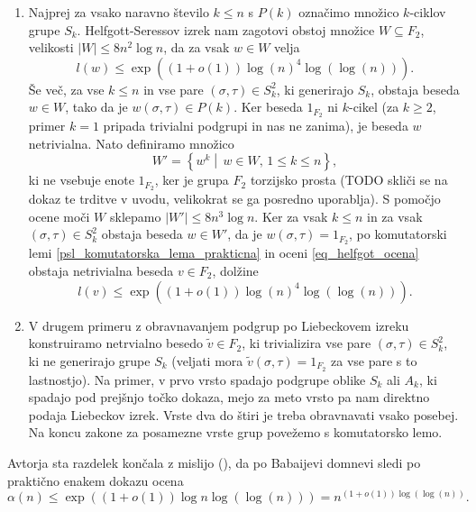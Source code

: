 \begin{enumerate}
    \item Najprej za vsako naravno število $k \le n$ s $P(k)$ označimo množico $k$-ciklov grupe $S_k$. Helfgott-Seressov izrek nam zagotovi obstoj množice $W \subseteq F_2$, velikosti $\lvert W \rvert \le 8n^2 \log n$, da za vsak $w \in W$ velja \begin{equation}\label{eq_helfgot_ocena}
        l(w) \le \exp((1 + o(1)) \log(n)^{4} \log(\log(n))).
    \end{equation}  
    Še več, za vse $k \le n$ in vse pare $(\sigma, \tau) \in S_k^2$, ki generirajo $S_k$,
    obstaja beseda $w \in W$, tako da je $w(\sigma, \tau) \in P(k)$. Ker beseda $1_{F_2}$ ni $k$-cikel (za $k \ge 2$, primer $k = 1$ pripada trivialni podgrupi in nas ne zanima), je beseda $w$ netrivialna. Nato definiramo množico \begin{equation*}
    W' = \left\{ w^{k}  \middle|\,  w \in W , \, 1 \le  k \le  n \right\}, 
    \end{equation*}  
    ki ne vsebuje enote $1_{F_2}$, ker je grupa $F_2$ torzijsko prosta (TODO skliči se na dokaz te trditve v uvodu, velikokrat se ga posredno uporablja). S pomočjo ocene moči $W$ sklepamo $\lvert W' \rvert \le 8 n^3 \log n$.
    Ker za vsak $k \le n$ in za vsak $(\sigma, \tau) \in S_k^2$ obstaja beseda $w \in W'$, da je $w(\sigma, \tau) = 1_{F_2}$, po komutatorski lemi \ref{psl_komutatorska_lema_prakticna} in oceni \ref{eq_helfgot_ocena} obstaja netrivialna beseda $v \in F_2$, dolžine
    \begin{equation*}
    l(v) \le \exp((1 + o(1)) \log(n)^{4} \log(\log(n))).
    \end{equation*}  
    \item V drugem primeru z obravnavanjem podgrup po Liebeckovem izreku konstruiramo netrvialno besedo $\tilde{v} \in F_2$, ki trivializira vse pare $(\sigma, \tau) \in S_k^2$, ki ne generirajo
    grupe $S_k$ (veljati mora $\tilde{v}(\sigma, \tau) = 1_{F_2}$ za vse pare s to lastnostjo). Na primer, v prvo vrsto spadajo podgrupe oblike $S_k$ ali $A_k$, ki spadajo pod prejšnjo točko dokaza, mejo za meto vrsto pa nam direktno podaja Liebeckov izrek. Vrste dva do štiri je treba obravnavati
    vsako posebej. Na koncu zakone za posamezne vrste grup povežemo s komutatorsko lemo.    
\end{enumerate}

Avtorja sta razdelek končala z mislijo (\cite[str.~82]{Kozma_Gady_2016}), da po Babaijevi domnevi sledi po praktično enakem dokazu ocena \begin{equation*}
\alpha(n) \le \exp((1 + o(1)) \log{n} \log(\log (n))) = n^{(1 + o(1)) \log(\log(n))}.
\end{equation*}  

